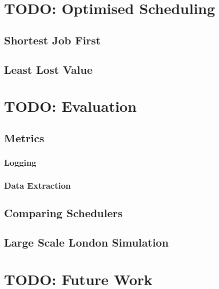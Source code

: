 \documentclass[a4paper,12pt,titlepage]{article}
\begin{document}
\section{TODO: Optimised Scheduling}
\subsection{Shortest Job First}
\subsection{Least Lost Value}

\newpage
\section{TODO: Evaluation}
\subsection{Metrics}
\subsubsection{Logging}
\subsubsection{Data Extraction}

\subsection{Comparing Schedulers}

\subsection{Large Scale London Simulation}

\newpage
\section{TODO: Future Work}
\end{document}
